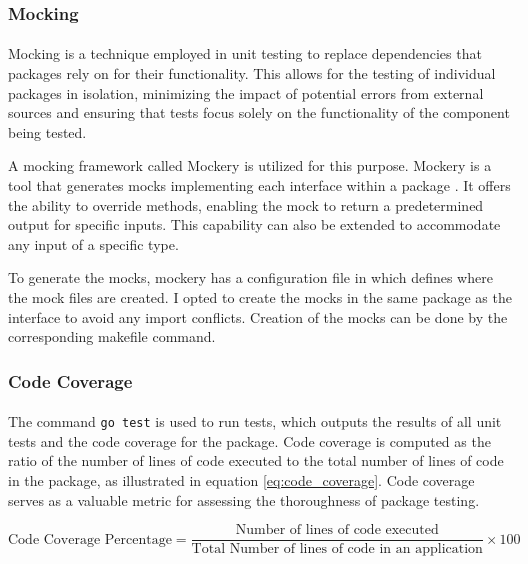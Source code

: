 \documentclass[12pt, conference, final, a4paper, onecolumn, compsoc]{IEEEtran}
\begin{document}
\subsubsection*{Mocking}
\paragraph{}

Mocking is a technique employed in unit testing to replace dependencies that
packages rely on for their functionality. This allows for the testing of
individual packages in isolation, minimizing the impact of potential errors from
external sources and ensuring that tests focus solely on the functionality of
the component being tested.

A mocking framework called Mockery is utilized for this purpose. Mockery is a
tool that generates mocks implementing each interface within a package
\citep{go-tools}. It offers the ability to override methods, enabling the mock
to return a predetermined output for specific inputs. This capability can also
be extended to accommodate any input of a specific type.

To generate the mocks, mockery has a configuration file in which defines where
the mock files are created. I opted to create the mocks in the same package as
the interface to avoid any import conflicts. Creation of the mocks can be done
by the corresponding makefile command.

\subsubsection*{Code Coverage}
\paragraph{}

The command \texttt{go test} is used to run tests, which outputs the results of
all unit tests and the code coverage for the package. Code coverage is computed
as the ratio of the number of lines of code executed to the total number of
lines of code in the package, as illustrated in equation \ref{eq:code_coverage}.
Code coverage serves as a valuable metric for assessing the thoroughness of
package testing.

\begin{equation} \text{Code Coverage Percentage} = \frac{\text{Number of lines
      of code executed}}{\text{Total Number of lines of code in an
      application}} \times 100
  \label{eq:code_coverage}
\end{equation}
\end{document}
